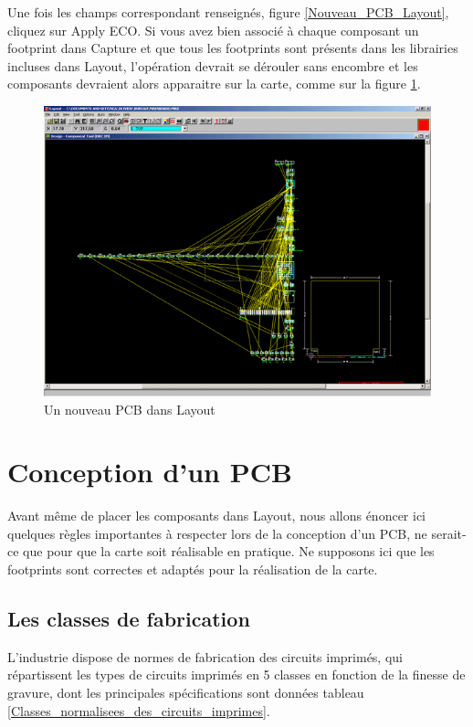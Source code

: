 \documentclass[a4paper]{article}
\begin{document}
Une fois les champs correspondant renseignés, figure \ref{Nouveau_PCB_Layout}, cliquez sur \og{}Apply ECO\fg{}. Si vous avez bien associé à chaque composant un footprint dans Capture et que tous les footprints sont présents dans les librairies incluses dans Layout, l'opération devrait se dérouler sans encombre et les composants devraient alors apparaitre sur la carte, comme sur la figure \ref{Nouveau_PCB}.

\begin{figure}[H]
	\centering
	\includegraphics[scale=0.75]{Images/Nouveau_PCB.png}
	\caption{Un nouveau PCB dans Layout
		\label{Nouveau_PCB}}
\end{figure}

\section{Conception d'un PCB}

Avant même de placer les composants dans Layout, nous allons énoncer ici quelques règles importantes à respecter lors de la conception d'un PCB, ne serait-ce que pour que la carte soit réalisable en pratique. Ne supposons ici que les footprints sont correctes et adaptés pour la réalisation de la carte.

\subsection{Les classes de fabrication}

L'industrie dispose de normes de fabrication des circuits imprimés, qui répartissent les types de circuits imprimés en 5 classes en fonction de la finesse de gravure, dont les principales spécifications sont données tableau \ref{Classes_normalisees_des_circuits_imprimes}.
\end{document}
